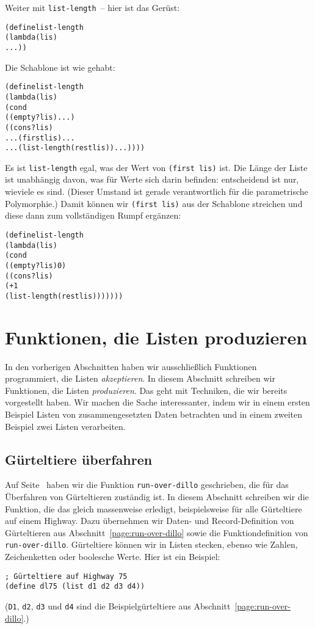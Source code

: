 Weiter mit \texttt{list-length}~-- hier ist das Gerüst:
%
\begin{alltt}
(define list-length
  (lambda (lis)
    ...))
\end{alltt}
%
Die Schablone ist wie gehabt:
%
\begin{alltt}
(define list-length
  (lambda (lis)
    (cond
      ((empty? lis) ...)
      ((cons? lis) 
       ... (first lis) ...
       ... (list-length (rest lis)) ...))))
\end{alltt}
%
Es ist \texttt{list-length} egal, was der Wert von \texttt{(first
  lis)} ist.  Die Länge der Liste ist unabhängig davon, was für Werte
sich darin befinden: entscheidend ist nur, wieviele es sind.  (Dieser
Umstand ist gerade verantwortlich für die parametrische Polymorphie.)
Damit können wir \texttt{(first lis)} aus der Schablone streichen und
diese dann zum vollständigen Rumpf ergänzen:
%
\begin{alltt}
(define list-length
  (lambda (lis)
    (cond
      ((empty? lis) 0)
      ((cons? lis) 
       (+ 1 
          (list-length (rest lis)))))))
\end{alltt}
%

\section{Funktionen, die Listen produzieren}

In den vorherigen Abschnitten haben wir ausschließlich Funktionen
programmiert, die Listen \emph{akzeptieren}.  In diesem Abschnitt
schreiben wir Funktionen, die Listen \emph{produzieren}.  Das geht mit
Techniken, die wir bereits vorgestellt haben.  Wir machen die Sache
interessanter, indem wir in einem ersten Beispiel Listen von
zusammengesetzten Daten betrachten und in einem zweiten Beispiel zwei
Listen verarbeiten.

\subsection{Gürteltiere überfahren}

Auf Seite~\pageref{page:run-over-dillo} haben wir die Funktion
\texttt{run-over-dillo} geschrieben, die für das Überfahren von
Gürteltieren zuständig ist.  In diesem Abschnitt schreiben wir die
Funktion, die das gleich massenweise erledigt, beispielsweise für alle
Gürteltiere auf einem Highway.  Dazu übernehmen wir Daten- und
Record-Definition von Gürteltieren aus
Abschnitt~\ref{page:run-over-dillo} sowie die Funktiondefinition von
\texttt{run-over-dillo}.  Gürteltiere können wir in Listen stecken,
ebenso wie Zahlen, Zeichenketten oder boolesche Werte.  Hier ist ein
Beispiel:
%
\begin{verbatim}
; Gürteltiere auf Highway 75
(define dl75 (list d1 d2 d3 d4))
\end{verbatim}
(\texttt{D1}, \texttt{d2}, \texttt{d3} und \texttt{d4} sind die
Beispielgürteltiere aus Abschnitt~\ref{page:run-over-dillo}.)


